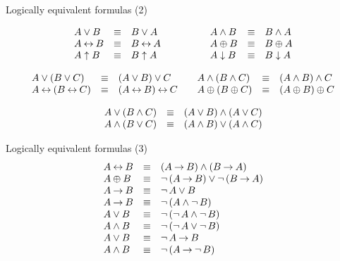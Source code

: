 \documentclass[style=simple,size=12pt]{powerdot}
\begin{document}
\begin{wideslide}[bm=,toc=]{Logically equivalent formulas (2)}

\begin{displaymath}
\begin{array}{lcl@{\hspace{5em}}lcl}
A\vee B &\logeqv& B\vee A & A\wedge B&\logeqv& B\wedge A\\
A\eqv B &\logeqv& B\eqv A &
   A\neqv B&\logeqv& B\neqv A\\
A\uparrow B &\logeqv& B\uparrow A &
   A\downarrow B&\logeqv& B\downarrow A\\
\end{array}
\end{displaymath}

\begin{displaymath}
\begin{array}{lcl@{\hspace{2em}}lcl}
A \vee (B\vee C) &\logeqv& (A\vee B) \vee C &
   A \wedge (B\wedge C) &\logeqv& (A\wedge B) \wedge C \\
A \eqv (B\eqv C) &\logeqv& (A\eqv B) \eqv C &
   A \neqv(B\neqv C) &\logeqv&
   (A\neqv B)\neqv C\\
\end{array}
\end{displaymath}

\begin{displaymath}
\begin{array}{lcl}
A\vee (B\wedge C) &\mathrel{\equiv}& (A\vee B)\wedge (A\vee C) \\
   A\wedge (B\vee C) &\mathrel{\equiv}& (A\wedge B) \vee (A\wedge C)\\
\end{array}
\end{displaymath}
\end{wideslide}

\begin{wideslide}[bm=,toc=]{Logically equivalent formulas (3)}
\begin{displaymath}
\begin{array}{lcl}
A \mathbin{\leftrightarrow} B &\mathrel{\equiv}& (A\mathbin{\rightarrow} B) \wedge (B\mathbin{\rightarrow} A) \\
A \mathbin{\oplus} B &\mathrel{\equiv}& \mathop{\neg}\,(A\mathbin{\rightarrow} B) \vee \mathop{\neg}\,(B\mathbin{\rightarrow} A)\\
A \mathbin{\rightarrow} B &\mathrel{\equiv}& \mathop{\neg} A\vee B\\
   A \mathbin{\rightarrow} B &\mathrel{\equiv}& \mathop{\neg}\,(A\wedge \mathop{\neg} B) \\
A \vee B &\mathrel{\equiv}& \mathop{\neg}\,(\mathop{\neg} A \wedge \mathop{\neg} B) \\
   A \wedge B &\mathrel{\equiv}& \mathop{\neg}\,(\mathop{\neg} A\vee \mathop{\neg} B)\\
A \vee B &\mathrel{\equiv}& \mathop{\neg} A \mathbin{\rightarrow} B  \\
   A \wedge B &\mathrel{\equiv}& \mathop{\neg}\,(A\mathbin{\rightarrow} \mathop{\neg} B)\\
\end{array}
\end{displaymath}
\end{wideslide}
\end{document}
